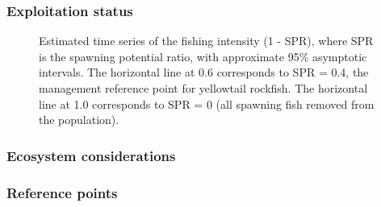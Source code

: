 \documentclass[
]{scrartcl}
\begin{document}
\clearpage

\subsubsection{Exploitation status}\label{exploitation-status}



\begin{figure}


\caption{\label{fig-es-spr}Estimated time series of the fishing
intensity (1 - SPR), where SPR is the spawning potential ratio, with
approximate 95\% asymptotic intervals. The horizontal line at 0.6
corresponds to SPR = 0.4, the management reference point for yellowtail
rockfish. The horizontal line at 1.0 corresponds to SPR = 0 (all
spawning fish removed from the population).}

\end{figure}%

\clearpage

\subsubsection{Ecosystem considerations}\label{ecosystem-considerations}

\subsubsection{Reference points}\label{reference-points}

\clearpage
\end{document}
